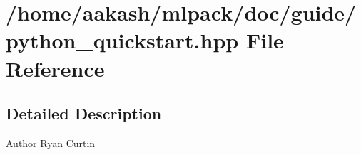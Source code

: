 \section{/home/aakash/mlpack/doc/guide/python\+\_\+quickstart.hpp File Reference}
\label{python__quickstart_8hpp}


\subsection{Detailed Description}
\begin{DoxyAuthor}{Author}
Ryan Curtin 
\end{DoxyAuthor}
